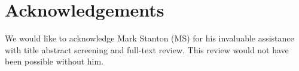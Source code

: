 \section*{Acknowledgements}
We would like to acknowledge Mark Stanton (MS) for his invaluable assistance with title abstract screening and full-text review. This review would not have been possible without him. 